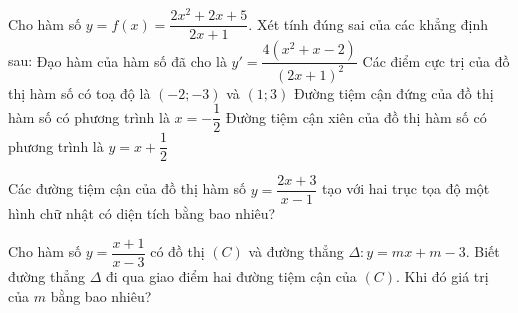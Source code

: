\begin{ex}
\begin{ex}
 Cho hàm số $y=f(x)=\dfrac{2 x^2+2 x+5}{2 x+1}$. Xét tính đúng sai của các khẳng định sau:
 \choiceTF
 {\True Đạo hàm của hàm số đã cho là $y'=\dfrac{4\left(x^2+x-2\right)}{(2 x+1)^2}$}
 {\True Các điểm cực trị của đồ thị hàm số có toạ độ là $(-2 ;-3)$ và $(1 ; 3)$}
 {\True Đường tiệm cận đứng của đồ thị hàm số có phương trình là $x=-\dfrac{1}{2}$}
 {\True Đường tiệm cận xiên của đồ thị hàm số có phương trình là $y=x+\dfrac{1}{2}$}
\end{ex}
\BTTL
\begin{ex}%
 Các đường tiệm cận của đồ thị hàm số $ y=\dfrac{2x+3}{x-1}$ tạo với hai trục tọa độ một hình chữ nhật có
 diện tích bằng bao nhiêu?\\
\end{ex}
\begin{ex}%
 Cho hàm số $y=\dfrac{x+1}{x-3}$ có đồ thị $(C)$ và đường thẳng $\Delta: y=mx+m-3.$ Biết đường thẳng $\Delta$ đi qua giao điểm hai đường tiệm cận của
 $(C).$ Khi đó giá trị của $m$ bằng bao nhiêu?\\

\end{ex}
\end{ex}
